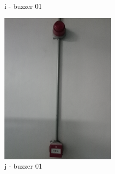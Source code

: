 \begin{figure}[h]
\begin{minipage}[b]{0.22\linewidth}
	\caption*{i - buzzer 01}
\end{minipage}
	\hspace{0.03cm}
\begin{minipage}[b]{0.22\linewidth}
	\centering
	\includegraphics[width=\textwidth]{figures/ch05_fdas_buzzer02}
	\caption*{j - buzzer 01}
\end{minipage}
	\hspace{0.03cm}
\begin{minipage}[b]{0.22\linewidth}
	\centering

\end{minipage}
\end{figure}
